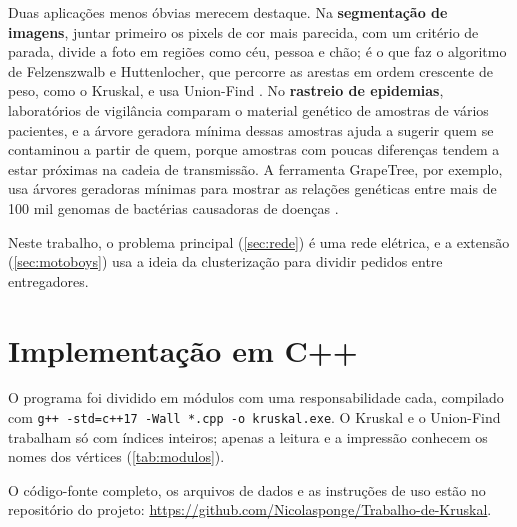 \documentclass[a4paper]{article}
\begin{document}
Duas aplicações menos óbvias merecem destaque. Na \textbf{segmentação de
imagens}, juntar primeiro os pixels de cor mais parecida, com um critério de
parada, divide a foto em regiões como céu, pessoa e chão; é o que faz o
algoritmo de Felzenszwalb e Huttenlocher, que percorre as arestas em ordem
crescente de peso, como o Kruskal, e usa Union-Find \cite{felzenszwalb2004}. No
\textbf{rastreio de epidemias}, laboratórios de vigilância comparam o material
genético de amostras de vários pacientes, e a árvore geradora mínima dessas
amostras ajuda a sugerir quem se contaminou a partir de quem, porque amostras com
poucas diferenças tendem a estar próximas na cadeia de transmissão. A ferramenta
GrapeTree, por exemplo, usa árvores geradoras mínimas para mostrar as relações
genéticas entre mais de 100 mil genomas de bactérias causadoras de doenças
\cite{zhou2018}.

Neste trabalho, o problema principal (\cref{sec:rede}) é uma rede elétrica, e a
extensão (\cref{sec:motoboys}) usa a ideia da clusterização para dividir pedidos
entre entregadores.

\section{Implementação em C++}\label{sec:implementacao}
O programa foi dividido em módulos com uma responsabilidade cada, compilado com
\texttt{g++ -std=c++17 -Wall *.cpp -o kruskal.exe}. O Kruskal e o Union-Find
trabalham só com índices inteiros; apenas a leitura e a impressão conhecem os
nomes dos vértices (\cref{tab:modulos}).

O código-fonte completo, os arquivos de dados e as instruções de uso estão no
repositório do projeto:
\url{https://github.com/Nicolasponge/Trabalho-de-Kruskal}.
\end{document}
